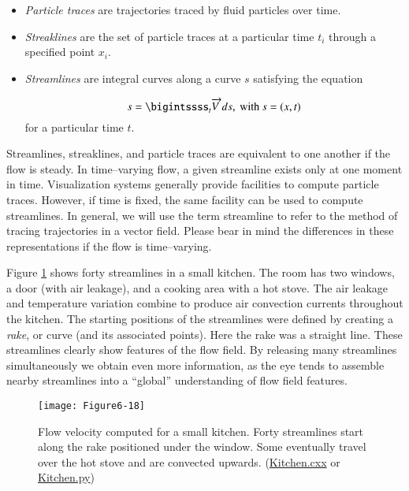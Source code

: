 \begin{itemize}

\item \emph{Particle traces} are trajectories traced by fluid particles over time.

\item \emph{Streaklines} are the set of particle traces at a particular time $t_i$ through a specified point $x_i$.

\item \emph{Streamlines} are integral curves along a curve $s$ satisfying the equation

\begin{equation}\label{eq:6.5}
s = \bigintssss_{t}\overrightarrow{V\ }ds, \ \text{with}\ s = (x,t)
\end{equation}
for a particular time $t$.
\end{itemize}

Streamlines, streaklines, and particle traces are equivalent to one another if the flow is steady. In time--varying flow, a given streamline exists only at one moment in time. Visualization systems generally provide facilities to compute particle traces. However, if time is fixed, the same facility can be used to compute streamlines. In general, we will use the term streamline to refer to the method of tracing trajectories in a vector field. Please bear in mind the differences in these representations if the flow is time--varying.

Figure \ref{fig:Figure6-18} shows forty streamlines in a small kitchen. The room has two windows, a door (with air leakage), and a cooking area with a hot stove. The air leakage and temperature variation combine to produce air convection currents throughout the kitchen. The starting positions of the streamlines were defined by creating a \emph{rake}, or curve (and its associated points). Here the rake was a straight line. These streamlines clearly show features of the flow field. By releasing many streamlines simultaneously we obtain even more information, as the eye tends to assemble nearby streamlines into a ``global'' understanding of flow field features.

\begin{figure}[htb]
	\texttt{[image: Figure6-18]}
	\caption{Flow velocity computed for a small kitchen. Forty streamlines start along the rake positioned under the window. Some eventually travel over the hot stove and are convected upwards. (\href{https://lorensen.github.io/VTKExamples/site/Cxx/Visualization/Kitchen}{Kitchen.cxx} or \href{https://lorensen.github.io/VTKExamples/site/Python/Visualization/Kitchen/}{Kitchen.py})}\label{fig:Figure6-18}
\end{figure}

